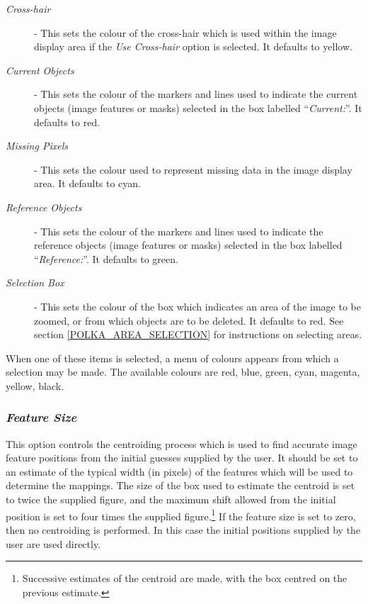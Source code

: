 \documentclass[11pt]{article}
\newcommand{\hyperref}[4]{#2\ref{#4}#3}
\newcommand{\htmlref}[2]{#1}
\newcommand{\xlabel}[1]{}
\newcommand{\mylabel}[1] {\xlabel{#1}\label{#1}}
\begin{document}
\begin{description}

\item [\emph{Cross-hair}] - This sets the colour of the cross-hair which
is used within the \htmlref{image display area}{POLKA_IMAGE_DISPLAY} if
the \htmlref{\emph{Use Cross-hair}}{POLKA_USE_CROSS_HAIR} option is
selected. It defaults to yellow.

\item [\emph{Current Objects}] - This sets the colour of the markers and
lines used to indicate the current objects (image features or masks)
selected in the box labelled ``\htmlref{\emph{Current:}}{POLKA_CURRENT}''.
It defaults to red.

\item [\emph{Missing Pixels}] -  This sets the colour used to represent
missing data in the \htmlref{image display area}{POLKA_IMAGE_DISPLAY}.
It defaults to cyan.

\item [\emph{Reference Objects}] - This sets the colour of the markers and
lines used to indicate the reference objects (image features or masks)
selected in the box labelled ``\htmlref{\emph{Reference:}}{POLKA_REFERENCE}''.
It defaults to green.

\item [\emph{Selection Box}] - This sets the colour of the box
which indicates an area of the image to be zoomed, or from which objects
are to be deleted. It defaults to red. \hyperref{Go here}{See
section }{}{POLKA_AREA_SELECTION} for instructions on selecting areas.

\end{description}

When one of these items is selected, a menu of colours appears from which
a selection may be made. The available colours are red, blue, green,
cyan, magenta, yellow, black.

\subsubsection {\mylabel{POLKA_FEATURE_SIZE}\emph{Feature Size}} This option
controls the centroiding process which is used to find accurate image
feature positions from the initial guesses supplied by the user. It
should be set to an estimate of the typical width (in pixels) of the
features which will be used to determine the mappings. The size of the
box used to estimate the centroid is set to twice the supplied figure,
and the maximum shift allowed from the initial position is set to four
times the supplied figure.\footnote{Successive estimates of the centroid
are made, with the box centred on the previous estimate.} If the feature
size is set to zero, then no centroiding is performed. In this case the
initial positions supplied by the user are used directly.
\end{document}
